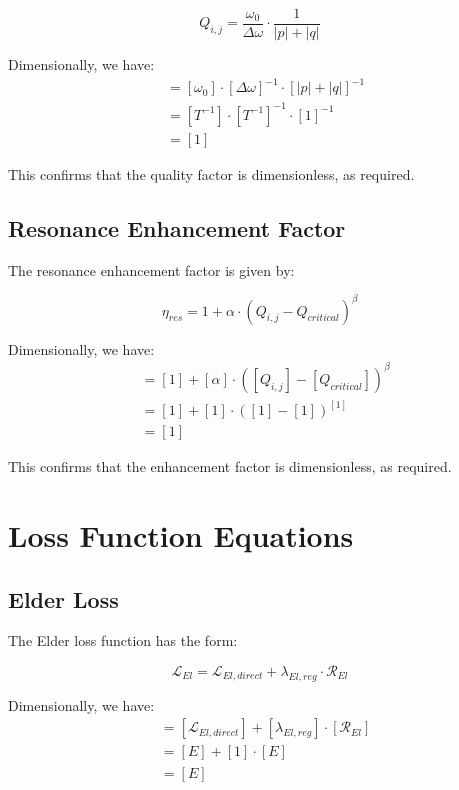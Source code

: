 \begin{equation}
Q_{i,j} = \frac{\omega_0}{\Delta \omega} \cdot \frac{1}{|p| + |q|}
\end{equation}

Dimensionally, we have:
\begin{align}
[Q_{i,j}] &= [\omega_0] \cdot [\Delta \omega]^{-1} \cdot [|p| + |q|]^{-1} \\
&= [T^{-1}] \cdot [T^{-1}]^{-1} \cdot [1]^{-1} \\
&= [1]
\end{align}

This confirms that the quality factor is dimensionless, as required.

\subsection{Resonance Enhancement Factor}

The resonance enhancement factor is given by:

\begin{equation}
\eta_{res} = 1 + \alpha \cdot (Q_{i,j} - Q_{critical})^{\beta}
\end{equation}

Dimensionally, we have:
\begin{align}
[\eta_{res}] &= [1] + [\alpha] \cdot ([Q_{i,j}] - [Q_{critical}])^{\beta} \\
&= [1] + [1] \cdot ([1] - [1])^{[1]} \\
&= [1]
\end{align}

This confirms that the enhancement factor is dimensionless, as required.

\section{Loss Function Equations}

\subsection{Elder Loss}

The Elder loss function has the form:

\begin{equation}
\mathcal{L}_{El} = \mathcal{L}_{El,direct} + \lambda_{El,reg} \cdot \mathcal{R}_{El}
\end{equation}

Dimensionally, we have:
\begin{align}
[\mathcal{L}_{El}] &= [\mathcal{L}_{El,direct}] + [\lambda_{El,reg}] \cdot [\mathcal{R}_{El}] \\
&= [E] + [1] \cdot [E] \\
&= [E]
\end{align}

